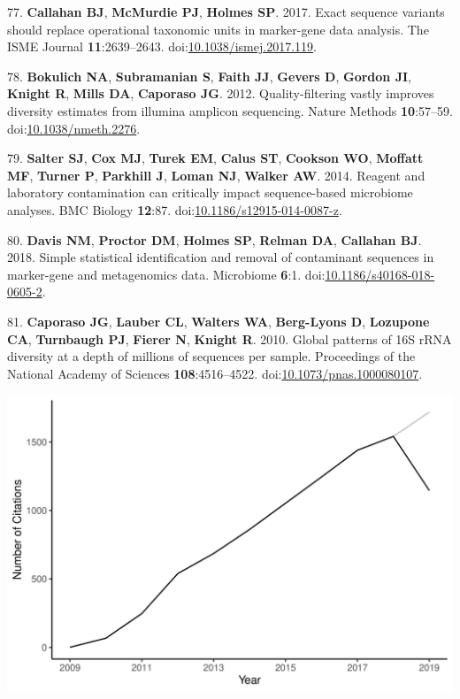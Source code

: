 \documentclass[11pt,]{article}
\begin{document}
\leavevmode\hypertarget{ref-Callahan2017}{}%
77. \textbf{Callahan BJ}, \textbf{McMurdie PJ}, \textbf{Holmes SP}.
2017. Exact sequence variants should replace operational taxonomic units
in marker-gene data analysis. The ISME Journal \textbf{11}:2639--2643.
doi:\href{https://doi.org/10.1038/ismej.2017.119}{10.1038/ismej.2017.119}.

\leavevmode\hypertarget{ref-Bokulich2012}{}%
78. \textbf{Bokulich NA}, \textbf{Subramanian S}, \textbf{Faith JJ},
\textbf{Gevers D}, \textbf{Gordon JI}, \textbf{Knight R}, \textbf{Mills
DA}, \textbf{Caporaso JG}. 2012. Quality-filtering vastly improves
diversity estimates from illumina amplicon sequencing. Nature Methods
\textbf{10}:57--59.
doi:\href{https://doi.org/10.1038/nmeth.2276}{10.1038/nmeth.2276}.

\leavevmode\hypertarget{ref-Salter2014}{}%
79. \textbf{Salter SJ}, \textbf{Cox MJ}, \textbf{Turek EM},
\textbf{Calus ST}, \textbf{Cookson WO}, \textbf{Moffatt MF},
\textbf{Turner P}, \textbf{Parkhill J}, \textbf{Loman NJ},
\textbf{Walker AW}. 2014. Reagent and laboratory contamination can
critically impact sequence-based microbiome analyses. BMC Biology
\textbf{12}:87.
doi:\href{https://doi.org/10.1186/s12915-014-0087-z}{10.1186/s12915-014-0087-z}.

\leavevmode\hypertarget{ref-Davis2018}{}%
80. \textbf{Davis NM}, \textbf{Proctor DM}, \textbf{Holmes SP},
\textbf{Relman DA}, \textbf{Callahan BJ}. 2018. Simple statistical
identification and removal of contaminant sequences in marker-gene and
metagenomics data. Microbiome \textbf{6}:1.
doi:\href{https://doi.org/10.1186/s40168-018-0605-2}{10.1186/s40168-018-0605-2}.

\leavevmode\hypertarget{ref-Caporaso2010b}{}%
81. \textbf{Caporaso JG}, \textbf{Lauber CL}, \textbf{Walters WA},
\textbf{Berg-Lyons D}, \textbf{Lozupone CA}, \textbf{Turnbaugh PJ},
\textbf{Fierer N}, \textbf{Knight R}. 2010. Global patterns of 16S rRNA
diversity at a depth of millions of sequences per sample. Proceedings of
the National Academy of Sciences \textbf{108}:4516--4522.
doi:\href{https://doi.org/10.1073/pnas.1000080107}{10.1073/pnas.1000080107}.

\newpage

\includegraphics{figure_1.png}
\end{document}
